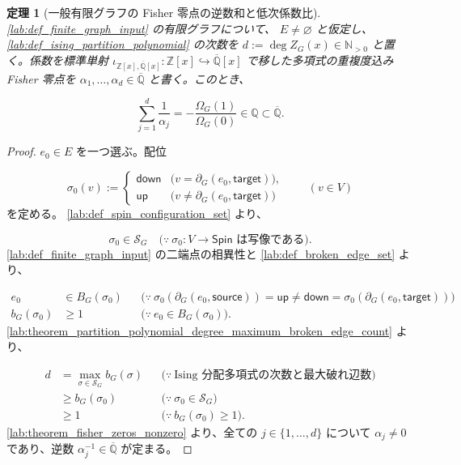 \documentclass[11pt,a4paper]{article}
\newtheorem{theorem}[definition]{定理}
\theoremstyle{remark}
\begin{document}
\begin{theorem}[一般有限グラフの Fisher 零点の逆数和と低次係数比]\label{lab:theorem_fisher_zero_reciprocal_sum_coefficient_ratio}
\cref{lab:def_finite_graph_input}
 の有限グラフについて、
$E\ne\varnothing$
 と仮定し、
\cref{lab:def_ising_partition_polynomial}
 の次数を 
$d:=\deg Z_G(x)\in\mathbb N_{>0}$
 と置く。係数を標準単射 
$\iota_{\mathbb Z[x],\overline{\mathbb Q}[x]}:\mathbb Z[x]\hookrightarrow\overline{\mathbb Q}[x]$
 で移した多項式の重複度込み Fisher 零点を 
$\alpha_1,\ldots,\alpha_d\in\overline{\mathbb Q}$
 と書く。このとき、

\[\sum_{j=1}^{d}\frac{1}{\alpha_j}
=
-\frac{\Omega_G(1)}{\Omega_G(0)}
\in\mathbb Q
\subset\overline{\mathbb Q}.\]
\end{theorem}
\begin{proof}
$e_0\in E$
 を一つ選ぶ。配位

\[\sigma_0(v):=
\begin{cases}
  \mathsf{down} & \bigl(v=\partial_G(e_0,\mathsf{target})\bigr),\\
  \mathsf{up} & \bigl(v\ne\partial_G(e_0,\mathsf{target})\bigr)
\end{cases}
\qquad(v\in V)\]
を定める。
\cref{lab:def_spin_configuration_set}
 より、

\[\sigma_0\in\mathcal S_G
\quad\bigl(\because\ \sigma_0:V\to\mathsf{Spin}\text{ は写像である}\bigr).\]
\cref{lab:def_finite_graph_input}
 の二端点の相異性と 
\cref{lab:def_broken_edge_set}
 より、

\[\begin{aligned}
e_0
&\in B_G(\sigma_0)
&&\bigl(\because\ \sigma_0(\partial_G(e_0,\mathsf{source}))=\mathsf{up}\ne\mathsf{down}=\sigma_0(\partial_G(e_0,\mathsf{target}))\bigr)\\
b_G(\sigma_0)
&\ge1
&&\bigl(\because\ e_0\in B_G(\sigma_0)\bigr).
\end{aligned}\]
\cref{lab:theorem_partition_polynomial_degree_maximum_broken_edge_count}
 より、

\[\begin{aligned}
d
&=\max_{\sigma\in\mathcal S_G}b_G(\sigma)
&&\bigl(\because\ \text{Ising 分配多項式の次数と最大破れ辺数}\bigr)\\
&\ge b_G(\sigma_0)
&&\bigl(\because\ \sigma_0\in\mathcal S_G\bigr)\\
&\ge1
&&\bigl(\because\ b_G(\sigma_0)\ge1\bigr).
\end{aligned}\]
\cref{lab:theorem_fisher_zeros_nonzero}
 より、全ての
$j\in\{1,\ldots,d\}$
 について
$\alpha_j\ne0$
 であり、逆数
$\alpha_j^{-1}\in\overline{\mathbb Q}$
 が定まる。


\end{proof}
\end{document}
